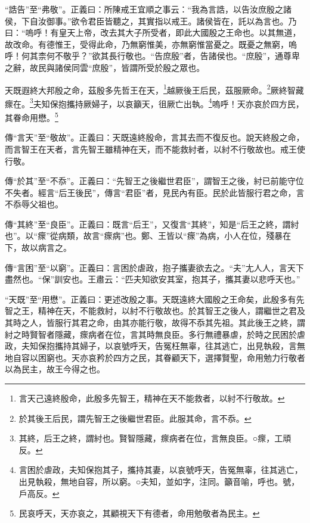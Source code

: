 {\noindent\shu{}\fzkt “誥告”至“弗敬”。正義曰：所陳戒王宜順之事云：“我為言誥，以告汝庶殷之諸侯，下自汝御事。”欲令君臣皆聽之，其實指以戒王。諸侯皆在，託以為言也。乃曰：“嗚呼！有皇天上帝，改去其大子所受者，即此大國殷之王命也。以其無道，故改命。有德惟王，受得此命，乃無窮惟美，亦無窮惟當憂之。既憂之無窮，嗚呼！何其柰何不敬乎？”欲其長行敬也。“告庶殷”者，告諸侯也。“庶殷”，通尊卑之辭，故民與諸侯同雲“庶殷”，皆謂所受於殷之眾也。 \par}

天既遐終大邦殷之命，茲殷多先哲王在天，\footnote{言天己遠終殷命，此殷多先智王，精神在天不能救者，以紂不行敬故。}越厥後王后民，茲服厥命。\footnote{於其後王后民，謂先智王之後繼世君臣。此服其命，言不忝。}厥終智藏瘝在。\footnote{其終，后王之終，謂紂也。賢智隱藏，瘝病者在位，言無良臣。○瘝，工頑反。}夫知保抱攜持厥婦子，以哀籲天，徂厥亡出執。\footnote{言困於虐政，夫知保抱其子，攜持其妻，以哀號呼天，告冤無辜，往其逃亡，出見執殺，無地自容，所以窮。○夫知，並如字，注同。籲音喻，呼也。號，戶高反。}嗚呼！天亦哀於四方民，其眷命用懋。\footnote{民哀呼天，天亦哀之，其顧視天下有德者，命用勉敬者為民主。}


{\noindent\zhuan{}\fzbyks 傳“言天”至“敬故”。正義曰：天既遠終殷命，言其去而不復反也。說天終殷之命，而言智王在天者，言先智王雖精神在天，而不能救紂者，以紂不行敬故也。戒王使行敬。 \par}

{\noindent\zhuan{}\fzbyks 傳“於其”至“不忝”。正義曰：“先智王之後繼世君臣”，謂智王之後，紂已前能守位不失者。經言“后王後民”，傳言“君臣”者，見民內有臣。民於此皆服行君之命，言不忝辱父祖也。 \par}

{\noindent\zhuan{}\fzbyks 傳“其終”至“良臣”。正義曰：既言“后王”，又復言“其終”，知是“后王之終，謂紂也”。以“瘝”從病類，故言“瘝病”也。鄭、王皆以“瘝”為病，小人在位，殘暴在下，故以病言之。 \par}

{\noindent\zhuan{}\fzbyks 傳“言困”至“以窮”。正義曰：言困於虐政，抱子攜妻欲去之。“夫”尢人人，言天下盡然也。“保”訓安也。王肅云：“匹夫知欲安其室，抱其子，攜其妻以悲呼天也。” \par}

{\noindent\shu{}\fzkt “天既”至“用懋”。正義曰：更述改殷之事。天既遠終大國殷之王命矣，此殷多有先智之王，精神在天，不能救紂，以紂不行敬故也。於其智王之後人，謂繼世之君及其時之人，皆服行其君之命，由其亦能行敬，故得不忝其先祖。其此後王之終，謂紂之時賢智者隱藏，瘝病者在位，言其時無良臣。多行無禮暴虐，於時之民困於虐政，夫知保抱攜持其婦子，以哀號呼天，告冤枉無辜，往其逃亡，出見執殺，言無地自容以困窮也。天亦哀矜於四方之民，其眷顧天下，選擇賢聖，命用勉力行敬者以為民主，故王今得之也。 \par}

